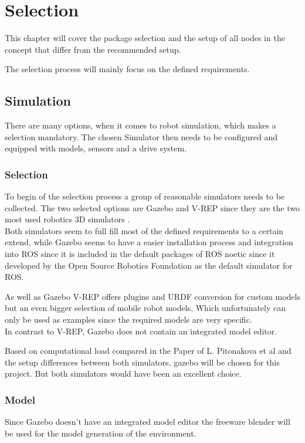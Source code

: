 \chapter{Selection}
\label{Selection}

This chapter will cover the package selection and the setup of all nodes in the concept that differ from the recommended setup.


The selection process will mainly focus on the defined requirements.

\section{Simulation}
There are many options, when it comes to robot simulation, which makes a selection mandatory. The chosen Simulator then needs to be configured and equipped with models, sensors and a drive system.

\subsection{Selection}
To begin of the selection process a group of reasonable simulators needs to be collected. The two selected options are Gazebo and V-REP since they are the two most used robotics 3D simulators \cite{SimComp}.\\

Both simulators seem to full fill most of the defined requirements to a certain extend, while Gazebo seems to have a easier installation process and integration into ROS since it is included in the default packages of ROS noetic \cite{ROSPkg} since it developed by the Open Source Robotics Foundation as the default simulator for ROS.

As well as Gazebo V-REP offers plugins and URDF conversion for custom models but an even bigger selection of mobile robot models. Which unfortunately can only be used as examples since the required models are very specific.\\
In contrast to V-REP, Gazebo does not contain an integrated model editor.

Based on computational load compared in the Paper of L. Pitonakova et al\cite{Pitonakova} and the setup differences between both simulators, gazebo will be chosen for this project. But both simulators would have been an excellent choice.

\subsection{Model}
Since Gazebo doesn't have an integrated model editor the freeware blender will be used for the model generation of the environment.

